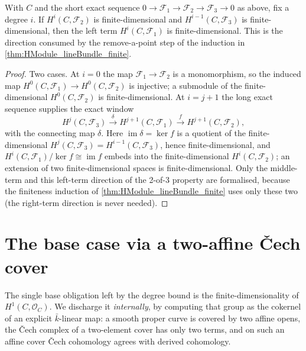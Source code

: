 \begin{lemma}
  \label{lem:HModule_finite_X1_of_ses}
  With \(C\) and the short exact sequence
  \(0 \to \mathcal F_1 \to \mathcal F_2 \to \mathcal F_3 \to 0\) as above,
  fix a degree \(i\). If \(H^i(C, \mathcal F_2)\) is finite-dimensional
  and \(H^{i-1}(C, \mathcal F_3)\) is finite-dimensional, then the left
  term \(H^i(C, \mathcal F_1)\) is finite-dimensional. This is the
  direction consumed by the remove-a-point step of the induction in
  \cref{thm:HModule_lineBundle_finite}.
\end{lemma}

\begin{proof}
  Two cases. At \(i = 0\) the map \(\mathcal F_1 \to \mathcal F_2\) is a
  monomorphism, so the induced map
  \(H^0(C, \mathcal F_1) \to H^0(C, \mathcal F_2)\) is injective; a
  submodule of the finite-dimensional \(H^0(C, \mathcal F_2)\) is
  finite-dimensional. At \(i = j+1\) the long exact sequence supplies the
  exact window
  \[
    H^{j}(C, \mathcal F_3) \xrightarrow{\;\delta\;}
      H^{j+1}(C, \mathcal F_1) \xrightarrow{\;f\;}
      H^{j+1}(C, \mathcal F_2),
  \]
  with the connecting map \(\delta\). Here \(\operatorname{im}\delta =
  \ker f\) is a quotient of the finite-dimensional
  \(H^{j}(C, \mathcal F_3) = H^{i-1}(C, \mathcal F_3)\), hence
  finite-dimensional, and \(H^{i}(C, \mathcal F_1)/\ker f \cong
  \operatorname{im} f\) embeds into the finite-dimensional
  \(H^{i}(C, \mathcal F_2)\); an extension of two finite-dimensional
  spaces is finite-dimensional. Only the middle-term and this left-term
  direction of the 2-of-3 property are formalised, because the
  finiteness induction of \cref{thm:HModule_lineBundle_finite} uses only
  these two (the right-term direction is never needed).
\end{proof}

\section{The base case via a two-affine Čech cover}
\label{sec:SerreFiniteness_cech}

The single base obligation left by the degree bound is the
finite-dimensionality of \(H^1(C, \mathcal O_C)\). We discharge it
\emph{internally}, by computing that group as the cokernel of an
explicit \(\bar k\)-linear map: a smooth proper curve is covered by two
affine opens, the Čech complex of a two-element cover has only two
terms, and on such an affine cover Čech cohomology agrees with derived
cohomology.

